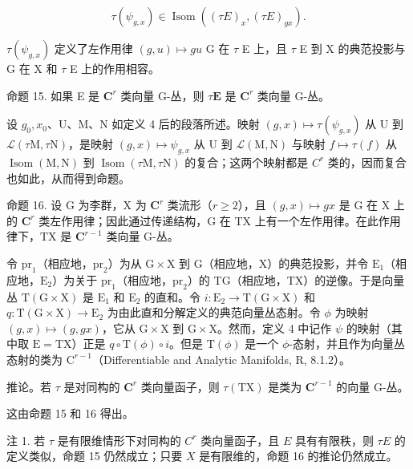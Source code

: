 \[
\tau (\psi_ {g, x}) \in \operatorname{Isom} ((\tau E) _ {x}, (\tau E) _ {g x}).
\]

\(\tau(\psi_{g,x})\) 定义了左作用律 \((g,u)\mapsto gu\) G 在 \(\tau\) E 上，且 \(\tau\) E 到 X 的典范投影与 G 在 X 和 \(\tau\) E 上的作用相容。

命题 15. 如果 E 是 \(\mathbf{C}^r\) 类向量 G-丛，则 \(\tau \mathbf{E}\) 是 \(\mathbf{C}^r\) 类向量 G-丛。

设 \(g_0, x_0\)、U、M、N 如定义 4 后的段落所述。映射 \((g, x) \mapsto \tau(\psi_{g,x})\) 从 U 到 \(\mathcal{L}(\tau\mathrm{M}, \tau\mathrm{N})\)，是映射 \((g, x) \mapsto \psi_{g,x}\) 从 U 到 \(\mathcal{L}(\mathrm{M}, \mathrm{N})\) 与映射 \(f \mapsto \tau(f)\) 从 \(\operatorname{Isom}(\mathrm{M}, \mathrm{N})\) 到 \(\operatorname{Isom}(\tau\mathrm{M}, \tau\mathrm{N})\) 的复合；这两个映射都是 \(C^r\) 类的，因而复合也如此，从而得到命题。

命题 16. 设 G 为李群，X 为 \(\mathbf{C}^r\) 类流形（\(r \geqslant 2\)），且 \((g, x) \mapsto gx\) 是 G 在 X 上的 \(\mathbf{C}^r\) 类左作用律；因此通过传递结构，G 在 TX 上有一个左作用律。在此作用律下，TX 是 \(\mathbf{C}^{r-1}\) 类向量 G-丛。

令 \(\mathrm{pr}_1\)（相应地，\(\mathrm{pr}_2\)）为从 \(\mathrm{G} \times \mathrm{X}\) 到 \(\mathrm{G}\)（相应地，\(\mathrm{X}\)）的典范投影，并令 \(\mathrm{E}_1\)（相应地，\(\mathrm{E}_2\)）为关于 \(\mathrm{pr}_1\)（相应地，\(\mathrm{pr}_2\)）的 TG（相应地，TX）的逆像。于是向量丛 \(\mathrm{T}(\mathrm{G} \times \mathrm{X})\) 是 \(\mathrm{E}_1\) 和 \(\mathrm{E}_2\) 的直和。令 \(i: \mathrm{E}_2 \to \mathrm{T}(\mathrm{G} \times \mathrm{X})\) 和 \(q: \mathrm{T}(\mathrm{G} \times \mathrm{X}) \to \mathrm{E}_2\) 为由此直和分解定义的典范向量丛态射。令 \(\phi\) 为映射 \((g, x) \mapsto (g, gx)\)，它从 \(\mathrm{G} \times \mathrm{X}\) 到 \(\mathrm{G} \times \mathrm{X}\)。然而，定义 4 中记作 \(\psi\) 的映射（其中取 \(\mathrm{E} = \mathrm{TX}\)）正是 \(q \circ \mathrm{T}(\phi) \circ i\)。但是 \(\mathrm{T}(\phi)\) 是一个 \(\phi\)-态射，并且作为向量丛态射的类为 \(\mathrm{C}^{r-1}\)（Differentiable and Analytic Manifolds, R, 8.1.2）。

推论。若 \(\tau\) 是对同构的 \(\mathbf{C}^r\) 类向量函子，则 \(\tau(\mathrm{TX})\) 是类为 \(\mathbf{C}^{r-1}\) 的向量 G-丛。

这由命题 15 和 16 得出。

注 1. 若 \(\tau\) 是有限维情形下对同构的 \(C^r\) 类向量函子，且 \(E\) 具有有限秩，则 \(\tau E\) 的定义类似，命题 15 仍然成立；只要 \(X\) 是有限维的，命题 16 的推论仍然成立。

